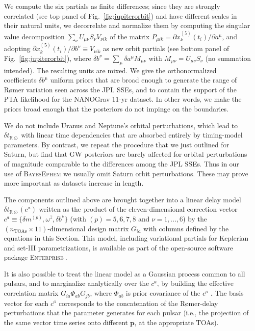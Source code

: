 \documentclass[iop,apj,twocolappendix]{emulateapj}
\begin{document}
\begin{itemize}
We compute the six partials as finite differences; since they are strongly correlated (see top panel of Fig.\ \ref{fig:jupiterorbit}) and have different scales in their natural units, we decorrelate and normalize them by computing the singular value decomposition $\sum_\nu U_{\mu\nu} S_\nu V_{\nu i k}$ of the matrix $P_{\mu i k} = \partial x^{(5)}_k(t_i)/\partial a^\mu$, and adopting $\partial x^{(5)}_k(t_i)/\partial b^\nu \equiv V_{\nu i k}$ as new orbit partials (see bottom panel of Fig.\ \ref{fig:jupiterorbit}), where $\delta b^\nu = \sum_\mu \delta a^\mu M_{\mu \nu}$ with $M_{\mu \nu} = U_{\mu\nu} S_\nu$ (no summation intended). The resulting units are mixed. We give the orthonormalized coefficients $\delta b^\mu$ uniform priors that are broad enough to generate the range of R{\o}mer variation seen across the JPL SSEs, and to contain the support of the PTA likelihood for the NANOGrav 11-yr dataset. In other words, we make the priors broad enough that the posteriors do not impinge on the boundaries.

We do not include Uranus and Neptune's orbital perturbations, which lead to $\delta t_{\mathrm{R\odot}}$ with linear time dependencies that are absorbed entirely by timing-model parameters. By contrast, we repeat the procedure that we just outlined for Saturn, but find that GW posteriors are barely affected for orbital perturbations of magnitude comparable to the differences among the JPL SSEs. Thus in our use of \textsc{BayesEphem} we usually omit Saturn orbit perturbations. These may prove more important as datasets increase in length.
\end{itemize}

The components outlined above are brought together into a linear delay model $\delta t_{\mathrm{R}\odot}(c^a)$ written as the product of the eleven-dimensional correction vector $c^a \equiv \{\delta m^{(p)}, \omega^{\hat{z}}, \delta b^\nu\}$ (with $(p) = 5,6,7,8$ and $\nu = 1, \ldots, 6$) by the $(n_\mathrm{TOAs} \times 11)$-dimensional design matrix $G_{i a}$ with columns defined by the equations in this Section. This model, including variational partials for Keplerian and set-III parametrizations, is available as part of the open-source software package \textsc{Enterprise} \citep{2019ascl.soft12015E}.

It is also possible to treat the linear model as a Gaussian process common to all pulsars, and to marginalize analytically over the $c^a$, by building the effective correlation matrix $G_{i a} \Phi_{ab} G_{j b}$, where $\Phi_{ab}$ is prior covariance of the $c^a$ \citep{vhv14}. The basis vector for each $c^a$ corresponds to the concatenation of the R{\o}mer-delay perturbations that the parameter generates for each pulsar (i.e., the projection of the same vector time series onto different $\mathbf{p}$, at the appropriate TOAs).
\end{document}
